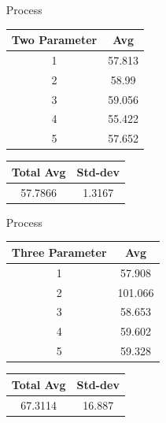 \begin{enumerate}
\begin{center}
\begin{tabular}{||c c||}
            \end{tabular}
        \end{center}\textbf{}
        \item [Process]
        \begin{center}
            \begin{tabular}{||c c||} 
             \hline
             Two Parameter & Avg \\ [0.5ex] 
             \hline\hline
             1 & 57.813  \\ 
             \hline
             2 & 58.99  \\ 
             \hline
             3 & 59.056  \\ 
             \hline
             4 & 55.422 \\ 
             \hline
             5 & 57.652  \\ 
             \hline
             \hline
            \end{tabular}
                \begin{tabular}{||c c||} 
                 \hline
                 Total Avg & Std-dev \\ [0.5ex] 
                 \hline\hline
                 57.7866 & 1.3167\\ 
                 \hline
            \end{tabular}
        \end{center}
        \item [Process]
        \begin{center}
            \begin{tabular}{||c c||} 
             \hline
             Three Parameter & Avg \\ [0.5ex] 
             \hline\hline
             1 & 57.908  \\ 
             \hline
             2 & 101.066  \\ 
             \hline
             3 & 58.653  \\ 
             \hline
             4 & 59.602 \\ 
             \hline
             5 & 59.328  \\ 
             \hline
             \hline
            \end{tabular}
            \begin{tabular}{||c c||} 
                 \hline
                 Total Avg & Std-dev \\ [0.5ex] 
                 \hline\hline
                 67.3114 & 16.887\\ 

\end{tabular}
\end{center}
\end{enumerate}
